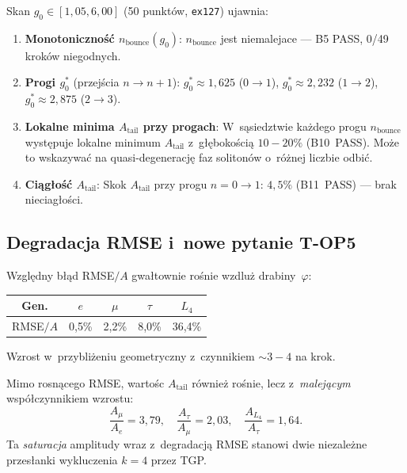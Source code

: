 Skan $g_0 \in [1{,}05, 6{,}00]$ (50 punkt\'ow, \texttt{ex127}) ujawnia:

\begin{enumerate}
  \item \textbf{Monotoniczno\'s\'c $n_{\mathrm{bounce}}(g_0)$}:
    $n_{\mathrm{bounce}}$ jest niemalejace --- B5 PASS, 0/49 krok\'ow
    niegodnych.

  \item \textbf{Progi $g_0^*$} (przej\'scia $n \to n{+}1$):
    $g_0^* \approx 1{,}625$ ($0\to1$),
    $g_0^* \approx 2{,}232$ ($1\to2$),
    $g_0^* \approx 2{,}875$ ($2\to3$).

  \item \textbf{Lokalne minima $A_{\mathrm{tail}}$ przy progach}:
    W~s\k{a}siedztwie ka\.zdego progu $n_{\mathrm{bounce}}$
    wyst\k{e}puje lokalne minimum $A_{\mathrm{tail}}$ z~g\l{}\k{e}boko\'sci\k{a}
    $10{-}20\%$ (B10~PASS).  Mo\.ze to wskazywa\'c na quasi-degeneracj\k{e}
    faz soliton\'ow o~r\'o\.znej liczbie odbi\'c.

  \item \textbf{Ci\k{a}g\l{}o\'s\'c $A_{\mathrm{tail}}$}:
    Skok $A_{\mathrm{tail}}$ przy progu $n=0\to1$: $4{,}5\%$ (B11~PASS) ---
    brak nieciag\l{}o\'sci.
\end{enumerate}

\subsection{Degradacja RMSE i~nowe pytanie T-OP5}
\label{app:T4-top5}

\begin{observation}\label{obs:T4-rmse-prog}
Wzgl\k{e}dny b\l{}\k{a}d RMSE$/A$ gwa\l{}townie ro\'snie wzdlu\.z
drabiny~$\varphi$:
\begin{center}
\begin{tabular}{ccccc}
\toprule
Gen. & $e$ & $\mu$ & $\tau$ & $L_4$ \\
\midrule
RMSE$/A$ & 0{,}5\% & 2{,}2\% & 8{,}0\% & 36{,}4\% \\
\bottomrule
\end{tabular}
\end{center}
Wzrost w~przybli\.zeniu geometryczny z~czynnikiem ${\sim}3{-}4$ na krok.
\end{observation}

\begin{remark}
Mimo rosn\k{a}cego RMSE, warto\'sc $A_{\mathrm{tail}}$ r\'ownie\.z ro\'snie,
lecz z~\emph{malej\k{a}cym} wsp\'o\l{}czynnikiem wzrostu:
\[
  \frac{A_\mu}{A_e} = 3{,}79,\quad
  \frac{A_\tau}{A_\mu} = 2{,}03,\quad
  \frac{A_{L_4}}{A_\tau} = 1{,}64.
\]
Ta \emph{saturacja} amplitudy wraz z~degradacj\k{a} RMSE stanowi
dwie niezale\.zne przes\l{}anki wykluczenia $k = 4$ przez TGP.
\end{remark}

